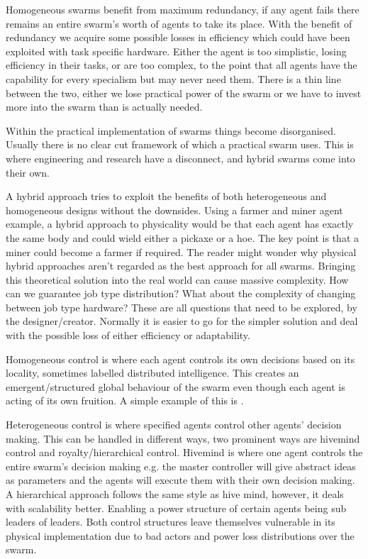 \documentclass{UoYCSproject}
\begin{document}
Homogeneous swarms benefit from maximum redundancy, if any agent fails there remains an entire swarm's worth of agents to take its place.
With the benefit of redundancy we acquire some possible losses in efficiency which could have been exploited with task specific hardware.
Either the agent is too simplistic, losing efficiency in their tasks, or are too complex, to the point that all agents have the capability for every specialism but may never need them.
There is a thin line between the two, either we lose practical power of the swarm or we have to invest more into the swarm than is actually needed.

Within the practical implementation of swarms things become disorganised.
Usually there is no clear cut framework of which a practical swarm uses.
This is where engineering and research have a disconnect, and hybrid swarms come into their own.

A hybrid approach tries to exploit the benefits of both heterogeneous and homogeneous designs without the downsides.
Using a farmer and miner agent example, a hybrid approach to physicality would be that each agent has exactly the same body and could wield either a pickaxe or a hoe. The key point is that a miner could become a farmer if required.
The reader might wonder why physical hybrid approaches aren’t regarded as the best approach for all swarms.
Bringing this theoretical solution into the real world can cause massive complexity.
How can we guarantee job type distribution?
What about the complexity of changing between job type hardware?
These are all questions that need to be explored, by the designer/creator.
Normally it is easier to go for the simpler solution and deal with the possible loss of either efficiency or adaptability.

Homogeneous control is where each agent controls its own decisions based on its locality, sometimes labelled distributed intelligence.
This creates an emergent/structured global behaviour of the swarm even though each agent is acting of its own fruition.
A simple example of this is \cite{Boids}.

Heterogeneous control is where specified agents control other agents' decision making.
This can be handled in different ways, two prominent ways are hivemind control \cite{HiveMind} and royalty/hierarchical control.
Hivemind is where one agent controls the entire swarm's decision making e.g. the master controller will give abstract ideas as parameters and the agents will execute them with their own decision making.
A hierarchical approach follows the same style as hive mind, however, it deals with scalability better.
Enabling a power structure of certain agents being sub leaders of leaders.
Both control structures leave themselves vulnerable in its physical implementation due to bad actors and power loss distributions over the swarm.
\end{document}
